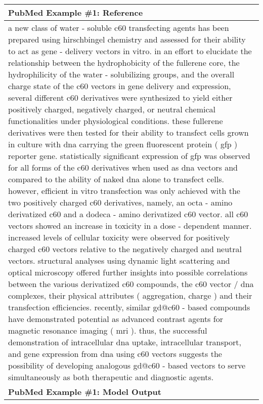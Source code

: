\documentclass{article} \usepackage{iclr2022_conference,times}
\begin{document}
\begin{table}[!htbp]
    \centering
    \tiny
    \begin{tabular}{p{\linewidth}} 
    \toprule
    \textbf{PubMed Example \#1: Reference} \\
    \midrule
a new class of water - soluble c60 transfecting agents has been prepared using hirschbingel chemistry and assessed for their ability to act as gene - delivery vectors in vitro. in an effort to elucidate the relationship between the hydrophobicity of the fullerene core, the hydrophilicity of the water - solubilizing groups, and the overall charge state of the c60 vectors in gene delivery and expression, several different c60 derivatives were synthesized to yield either positively charged, negatively charged, or neutral chemical functionalities under physiological conditions. these fullerene derivatives were then tested for their ability to transfect cells grown in culture with dna carrying the green fluorescent protein ( gfp ) reporter gene. statistically significant expression of gfp was observed for all forms of the c60 derivatives when used as dna vectors and compared to the ability of naked dna alone to transfect cells. however, efficient in vitro transfection was only achieved with the two positively charged c60 derivatives, namely, an octa - amino derivatized c60 and a dodeca - amino derivatized c60 vector. all c60 vectors showed an increase in toxicity in a dose - dependent manner. increased levels of cellular toxicity were observed for positively charged c60 vectors relative to the negatively charged and neutral vectors. structural analyses using dynamic light scattering and optical microscopy offered further insights into possible correlations between the various derivatized c60 compounds, the c60 vector / dna complexes, their physical attributes ( aggregation, charge ) and their transfection efficiencies. recently, similar gd@c60 - based compounds have demonstrated potential as advanced contrast agents for magnetic resonance imaging ( mri ). thus, the successful demonstration of intracellular dna uptake, intracellular transport, and gene expression from dna using c60 vectors suggests the possibility of developing analogous gd@c60 - based vectors to serve simultaneously as both therapeutic and diagnostic agents.
    \\
    \midrule
    \textbf{PubMed Example \#1: Model Output} \\
    \midrule

\end{tabular}
\end{table}
\end{document}
